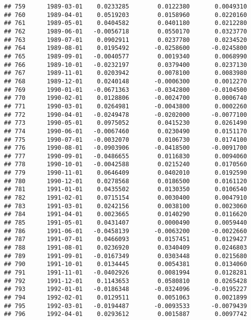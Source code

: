 \documentclass[
]{article}
\begin{document}
\begin{verbatim}
## 759      1989-03-01    0.0233285        0.0122380       0.0049310
## 760      1989-04-01    0.0519203        0.0158960       0.0220160
## 761      1989-05-01    0.0404582        0.0401180       0.0212280
## 762      1989-06-01   -0.0056718        0.0550170       0.0323770
## 763      1989-07-01    0.0902911        0.0237780       0.0234520
## 764      1989-08-01    0.0195492       -0.0258600      -0.0245800
## 765      1989-09-01   -0.0040577        0.0019340       0.0068990
## 766      1989-10-01   -0.0232197        0.0379400       0.0237130
## 767      1989-11-01    0.0203942        0.0078100       0.0083980
## 768      1989-12-01    0.0240148       -0.0006300       0.0012270
## 769      1990-01-01   -0.0671363       -0.0342800      -0.0104500
## 770      1990-02-01    0.0128806       -0.0024700       0.0006740
## 771      1990-03-01    0.0264981       -0.0043800       0.0002260
## 772      1990-04-01   -0.0249478       -0.0202000      -0.0077100
## 773      1990-05-01    0.0975052        0.0415230       0.0261490
## 774      1990-06-01   -0.0067460        0.0230490       0.0151170
## 775      1990-07-01   -0.0032070        0.0106730       0.0174100
## 776      1990-08-01   -0.0903906       -0.0418500      -0.0091700
## 777      1990-09-01   -0.0486655        0.0116830       0.0094060
## 778      1990-10-01   -0.0042588        0.0215240       0.0170560
## 779      1990-11-01    0.0646409        0.0402010       0.0192590
## 780      1990-12-01    0.0278568        0.0186500       0.0161120
## 781      1991-01-01    0.0435502        0.0130350       0.0106540
## 782      1991-02-01    0.0715154        0.0030400       0.0047910
## 783      1991-03-01    0.0242156        0.0038100       0.0023060
## 784      1991-04-01    0.0023665        0.0140290       0.0116620
## 785      1991-05-01    0.0431407        0.0000490       0.0059440
## 786      1991-06-01   -0.0458139       -0.0063200      -0.0022660
## 787      1991-07-01    0.0466093        0.0157451       0.0129427
## 788      1991-08-01    0.0236920        0.0340409       0.0246803
## 789      1991-09-01   -0.0167349        0.0303448       0.0215680
## 790      1991-10-01    0.0134445        0.0054381       0.0134060
## 791      1991-11-01   -0.0402926        0.0081994       0.0128281
## 792      1991-12-01    0.1143653        0.0580810       0.0265428
## 793      1992-01-01   -0.0186348       -0.0324096      -0.0195227
## 794      1992-02-01    0.0129511        0.0051063       0.0021899
## 795      1992-03-01   -0.0194487       -0.0093533      -0.0079439
## 796      1992-04-01    0.0293612        0.0015887       0.0097742

\end{verbatim}
\end{document}
